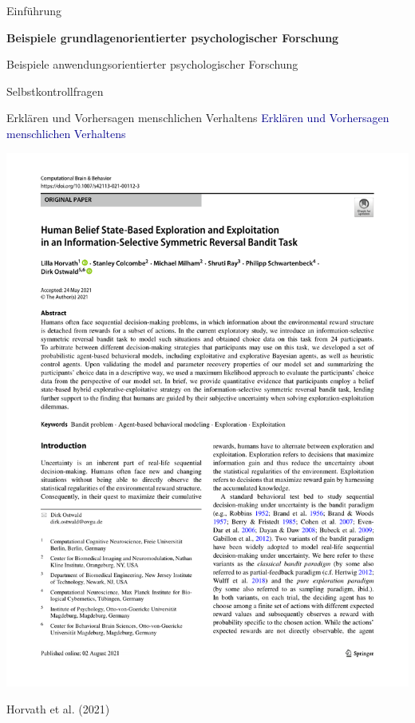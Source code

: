 \documentclass[
  8pt,
  ignorenonframetext,
]{beamer}
\begin{document}
\begin{frame}{}
\protect\hypertarget{section-4}{}
\large

Einführung

\textbf{Beispiele grundlagenorientierter psychologischer Forschung}

Beispiele anwendungsorientierter psychologischer Forschung

Selbstkontrollfragen
\end{frame}

\begin{frame}{Erklären und Vorhersagen menschlichen Verhaltens}
\protect\hypertarget{erkluxe4ren-und-vorhersagen-menschlichen-verhaltens}{}
\textcolor{darkblue}{Erklären und Vorhersagen menschlichen Verhaltens}
\vspace{2mm}

\begin{center}\includegraphics[width=0.8\linewidth]{2_Abbildungen/pfm_2_horvath_abstract} \end{center}

\flushright
\footnotesize

Horvath et al. (2021)
\end{frame}
\end{document}
